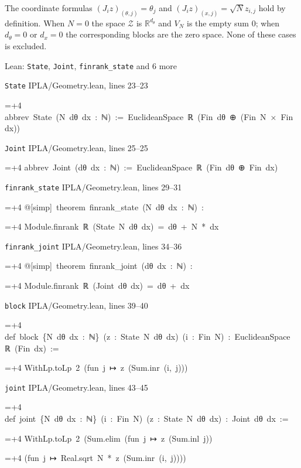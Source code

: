 \documentclass[11pt,a4paper]{report}
\newlength{\leancharwidth}
\newenvironment{leancode}{\par\smallskip\begingroup\ttfamily\footnotesize\raggedright
  \settowidth{\leancharwidth}{M}\setlength{\parskip}{0pt}\setlength{\parindent}{0pt}
  \frenchspacing}{\par\endgroup\smallskip}
\newcommand{\leanline}[2]{\hangindent=\dimexpr#1\leancharwidth+4\leancharwidth\relax
  \hangafter=1\noindent\hspace*{#1\leancharwidth}#2\par}
\newcommand{\leansource}[1]{\par{\footnotesize\color{leanmuted}#1}\par}
\begin{document}
The coordinate formulas \((J_iz)_{(\theta,j)}=\theta_j\) and \((J_iz)_{(x,j)}=\sqrt N z_{i,j}\) hold by definition. When \(N=0\) the space \(\mathcal Z\) is \(\mathbb R^{d_\theta}\) and \(V_N\) is the empty sum \(0\); when \(d_\theta=0\) or \(d_x=0\) the corresponding blocks are the zero space. None of these cases is excluded.

\begin{leanbox}{Lean: \texttt{State}, \texttt{Joint}, \texttt{finrank\_\allowbreak{}state} and 6 more}
\leansource{\texttt{State} \quad IPLA/\allowbreak{}Geometry.lean, lines 23–23}
\begin{leancode}
\leanline{0}{abbrev\ State\ (N\ dθ\ dx\ :\ ℕ)\ :=\ EuclideanSpace\ ℝ\ (Fin\ dθ\ ⊕\ (Fin\ N\ ×\ Fin\ dx))}
\end{leancode}
\leansource{\texttt{Joint} \quad IPLA/\allowbreak{}Geometry.lean, lines 25–25}
\begin{leancode}
\leanline{0}{abbrev\ Joint\ (dθ\ dx\ :\ ℕ)\ :=\ EuclideanSpace\ ℝ\ (Fin\ dθ\ ⊕\ Fin\ dx)}
\end{leancode}
\leansource{\texttt{finrank\_\allowbreak{}state} \quad IPLA/\allowbreak{}Geometry.lean, lines 29–31}
\begin{leancode}
\leanline{0}{@[simp]\ theorem\ finrank\_state\ (N\ dθ\ dx\ :\ ℕ)\ :}
\leanline{4}{Module.finrank\ ℝ\ (State\ N\ dθ\ dx)\ =\ dθ\ +\ N\ *\ dx}
\end{leancode}
\leansource{\texttt{finrank\_\allowbreak{}joint} \quad IPLA/\allowbreak{}Geometry.lean, lines 34–36}
\begin{leancode}
\leanline{0}{@[simp]\ theorem\ finrank\_joint\ (dθ\ dx\ :\ ℕ)\ :}
\leanline{4}{Module.finrank\ ℝ\ (Joint\ dθ\ dx)\ =\ dθ\ +\ dx}
\end{leancode}
\leansource{\texttt{block} \quad IPLA/\allowbreak{}Geometry.lean, lines 39–40}
\begin{leancode}
\leanline{0}{def\ block\ \{N\ dθ\ dx\ :\ ℕ\}\ (z\ :\ State\ N\ dθ\ dx)\ (i\ :\ Fin\ N)\ :\ EuclideanSpace\ ℝ\ (Fin\ dx)\ :=}
\leanline{2}{WithLp.toLp\ 2\ (fun\ j\ ↦\ z\ (Sum.inr\ (i,\ j)))}
\end{leancode}
\leansource{\texttt{joint} \quad IPLA/\allowbreak{}Geometry.lean, lines 43–45}
\begin{leancode}
\leanline{0}{def\ joint\ \{N\ dθ\ dx\ :\ ℕ\}\ (i\ :\ Fin\ N)\ (z\ :\ State\ N\ dθ\ dx)\ :\ Joint\ dθ\ dx\ :=}
\leanline{2}{WithLp.toLp\ 2\ (Sum.elim\ (fun\ j\ ↦\ z\ (Sum.inl\ j))}
\leanline{4}{(fun\ j\ ↦\ Real.sqrt\ N\ *\ z\ (Sum.inr\ (i,\ j))))}
\end{leancode}

\end{leanbox}
\end{document}
